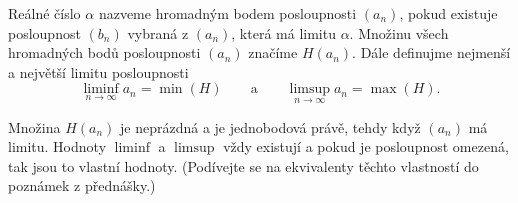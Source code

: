 \begin{definition}
	Reálné číslo $\alpha$ nazveme hromadným bodem posloupnosti $(a_n)$, pokud existuje posloupnost $(b_n)$ vybraná z $(a_n)$, která má limitu $\alpha$.
	Množinu všech hromadných bodů posloupnosti $(a_n)$ značíme $H(a_n)$.
	Dále definujme nejmenší a největší limitu posloupnosti
	$$
			\liminf_{n \rightarrow \infty} a_n = \min(H) \qquad \mbox{a} \qquad \limsup_{n \rightarrow \infty} a_n = \max(H).
	$$ 
	\label{def:hromadny_bod}
\end{definition}

\begin{theorem}
	Množina $H(a_n)$ je neprázdná a je jednobodová právě, tehdy když $(a_n)$ má limitu.
	Hodnoty $\liminf$ a $\limsup$ vždy existují a pokud je posloupnost omezená, tak jsou to vlastní hodnoty.
	(Podívejte se na ekvivalenty těchto vlastností do poznámek z přednášky.)
	\label{thm:vety_o_hromadnych_bodech}
\end{theorem}

